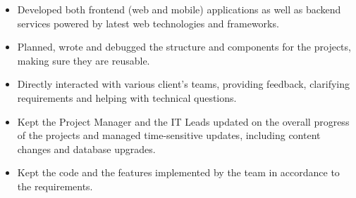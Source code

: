 \documentclass[10pt,a4paper,ragged2e]{altacv}
\begin{document}

\begin{fullwidth}
\makecvheader
\end{fullwidth}



\begin{itemize}
\item Developed both frontend (web and mobile) applications as well as backend services powered by latest web technologies and frameworks.
\smallskip
\item Planned, wrote and debugged the structure and components for the projects, making sure they are reusable.
\smallskip
\item Directly interacted with various client's teams, providing feedback, clarifying requirements and helping with technical questions.
\smallskip
\item Kept the Project Manager and the IT Leads updated on the overall progress of the projects and managed time-sensitive updates, including content changes and database upgrades.
\smallskip
\item Kept the code and the features implemented by the team in accordance to the requirements.
\end{itemize}
\end{document}
